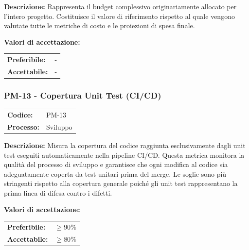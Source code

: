 \documentclass[a4paper,11pt,oneside]{scrartcl}
\begin{document}
\vspace{0.3cm}
\noindent\textbf{Descrizione:} Rappresenta il budget complessivo originariamente allocato per l'intero progetto. Costituisce il valore di riferimento rispetto al quale vengono valutate tutte le metriche di costo e le proiezioni di spesa finale.

\vspace{0.2cm}
\noindent\textbf{Valori di accettazione:}
\vspace{0.1cm}

\noindent
\begin{tabular}{@{}ll@{}}
\textbf{Preferibile:} & - \\
\textbf{Accettabile:} & - \\
\end{tabular}

\subsubsection{PM-13 - Copertura Unit Test (CI/CD)}

\noindent
\begin{tabular}{@{}p{}p{}@{}}
\textbf{Codice:} & PM-13 \\
\textbf{Processo:} & Sviluppo \\
\end{tabular}

\vspace{0.3cm}
\noindent\textbf{Descrizione:} Misura la copertura del codice raggiunta esclusivamente dagli unit test{\scriptsize{}} eseguiti automaticamente nella pipeline{\scriptsize{}} CI/CD{\scriptsize{}}. Questa metrica monitora la qualità del processo di sviluppo e garantisce che ogni modifica al codice sia adeguatamente coperta da test unitari prima del merge. Le soglie sono più stringenti rispetto alla copertura generale poiché gli unit test rappresentano la prima linea di difesa contro i difetti.

\vspace{0.2cm}
\noindent\textbf{Valori di accettazione:}
\vspace{0.1cm}

\noindent
\begin{tabular}{@{}ll@{}}
\textbf{Preferibile:} & $\ge 90\%$ \\
\textbf{Accettabile:} & $\ge 80\%$ \\
\end{tabular}
\end{document}
